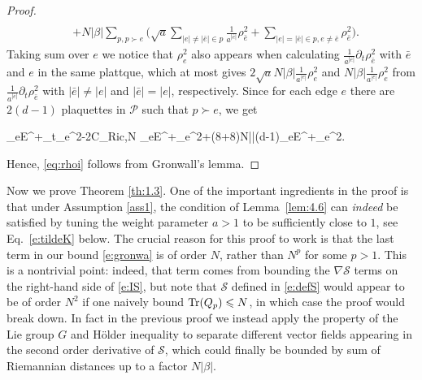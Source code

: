 \documentclass[11pt,UTF-8,reqno]{amsart}
\numberwithin{equation}{section}
\newtheorem{theorem}{Theorem}[section]
\def\p{\partial}
\def\tr{\mathrm {tr}}
\def\Ric{{\rm Ricci}}
\def\cP{{\mathcal P}}
\def\cQ{{\mathcal Q}}
\def\cS{{\mathcal S}}
\def\sP{{\mathscr P}}
\def\geq{\geqslant}
\def\leq{\leqslant}
\def\le{\leqslant}
\def\p{\partial}
\def\tr{\mathrm {tr}}
\def\Ric{{\rm Ric}}
\def\tr{{\rm Tr}}
\def\bt{\begin{theorem}}
\def\et{\end{theorem}}
\def\geq{\geqslant}
\def\leq{\leqslant}
\def\le{\leqslant}
\begin{document}
\begin{proof}
\begin{align*}
	\\
	&+N|\beta|\sum_{p,p\succ e}
	\Big(\sqrt{a}\sum_{|e|\neq|\bar e|\in p}\frac1{a^{|\bar e|}}\rho_{\bar e}^2+\sum_{|e|=|\bar e|\in p,e\neq\bar e}\rho_{\bar e}^2\Big).
\end{align*}
Taking sum over $e$ we notice that $\rho_e^2$ also appears when calculating $\frac1{a^{|\bar e|}}\p_t\rho_{\bar e}^2$ with $\bar e$ and $e$ in the same plattque, which at most gives $2\sqrt aN|\beta| \frac1{a^{|e|}}\rho_e^2$ and $N|\beta| \frac1{a^{|e|}}\rho_e^2$ from $\frac1{a^{|\bar e|}}\p_t\rho_{\bar e}^2$ with $|\bar e|\neq|e|$ and  $|\bar e|=|e|$, respectively. Since for each edge $e$ there are
$2(d -1)$ plaquettes in $\cP$ such that $p\succ e$, we get
\begin{equ}[e:gronwa]
	\sum_{e\in E^+}\p_t\rho_e^2\leq -2C_{\Ric,N} \sum_{e\in E^+}\rho_e^2+(8+8)N|\beta|(d-1)\sum_{e\in E^+}\rho_e^2.
\end{equ}
Hence, \eqref{eq:rhoi} follows from Gronwall's lemma.
\end{proof}






Now we prove Theorem \ref{th:1.3}. 
One of the important ingredients 
in the proof 
is that under Assumption \ref{ass1},
 the condition of Lemma~\ref{lem:4.6}
can {\it indeed} be satisfied
by tuning the weight parameter $a>1$ to be sufficiently close to $1$,
see Eq.~\eqref{e:tildeK} below.
The crucial reason for this proof to work
is that the last term in our bound \eqref{e:gronwa}
is of order $N$,
rather than $N^p$ for some $p>1$.
This is a nontrivial point:
indeed, that term comes from bounding the $\nabla \cS$ terms
on the right-hand side of  \eqref{e:IS},
but note that 
 $\cS$ defined in \eqref{e:defS} would appear to 
be of order $N^2$ if one naively bound $\tr(Q_p) \le N$, in which case the proof would break down.
In fact in the previous proof we instead apply the property of the Lie group $G$ and H\"older inequality to separate different vector fields appearing in the second order derivative of $\cS$, which could finally be bounded by sum of Riemannian distances up to a factor $N|\beta|$.
\end{document}

